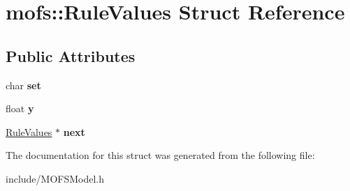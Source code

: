 \hypertarget{structmofs_1_1RuleValues}{\section{mofs\-:\-:Rule\-Values Struct Reference}
\label{structmofs_1_1RuleValues}
}
\subsection*{Public Attributes}
\begin{DoxyCompactItemize}
\item 
\hypertarget{structmofs_1_1RuleValues_ad6ab1d226cf2fff1902a5e871cbfa044}{char {\bfseries set}}\label{structmofs_1_1RuleValues_ad6ab1d226cf2fff1902a5e871cbfa044}

\item 
\hypertarget{structmofs_1_1RuleValues_abff55dde2cdbcb964c3b6cc6aec13f63}{float {\bfseries y}}\label{structmofs_1_1RuleValues_abff55dde2cdbcb964c3b6cc6aec13f63}

\item 
\hypertarget{structmofs_1_1RuleValues_adc7b0b97d20b09db33de157840a80430}{\hyperlink{structmofs_1_1RuleValues}{Rule\-Values} $\ast$ {\bfseries next}}\label{structmofs_1_1RuleValues_adc7b0b97d20b09db33de157840a80430}

\end{DoxyCompactItemize}


The documentation for this struct was generated from the following file\-:\begin{DoxyCompactItemize}
\item 
include/M\-O\-F\-S\-Model.\-h\end{DoxyCompactItemize}
